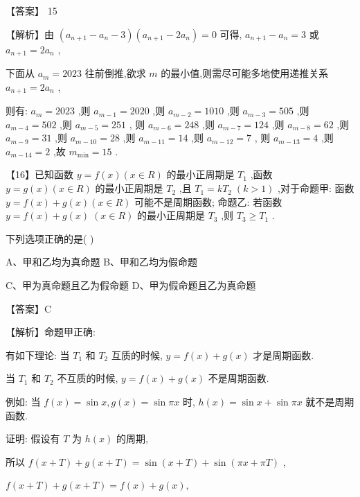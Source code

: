 \documentclass[10pt]{article}
\begin{document}
【答案】 15

【解析】由 \(\left( {{a}_{n + 1} - {a}_{n} - 3}\right) \left( {{a}_{n + 1} - 2{a}_{n}}\right)  = 0\) 可得, \({a}_{n + 1} - {a}_{n} = 3\) 或 \({a}_{n + 1} = 2{a}_{n}\) ,

下面从 \({a}_{m} = {2023}\) 往前倒推,欲求 \(m\) 的最小值,则需尽可能多地使用递推关系 \({a}_{n + 1} = 2{a}_{n}\) ,

则有: \({a}_{m} = {2023}\) ,则 \({a}_{m - 1} = {2020}\) ,则 \({a}_{m - 2} = {1010}\) ,则 \({a}_{m - 3} = {505}\) ,则 \({a}_{m - 4} = {502}\) ,则 \({a}_{m - 5} = {251}\) , 则 \({a}_{m - 6} = {248}\) ,则 \({a}_{m - 7} = {124}\) ,则 \({a}_{m - 8} = {62}\) ,则 \({a}_{m - 9} = {31}\) ,则 \({a}_{m - {10}} = {28}\) ,则 \({a}_{m - {11}} = {14}\) ,则 \({a}_{m - {12}} = 7\) , 则 \({a}_{m - {13}} = 4\) ,则 \({a}_{m - {14}} = 2\) ,故 \({m}_{\min } = {15}\) .

【16】已知函数 \(y = f\left( x\right) \left( {x \in  R}\right)\) 的最小正周期是 \({T}_{1}\) ,函数 \(y = g\left( x\right) \left( {x \in  R}\right)\) 的最小正周期是 \({T}_{2}\) ,且 \({T}_{1} = k{T}_{2} \; \left( {k > 1}\right)\) ,对于命题甲: 函数 \(y = f\left( x\right)  + g\left( x\right) \left( {x \in  R}\right)\) 可能不是周期函数; 命题乙: 若函数 \(y = f\left( x\right)  + g\left( x\right) \; \left( {x \in  R}\right)\) 的最小正周期是 \({T}_{3}\) ,则 \({T}_{3} \geq  {T}_{1}\) .

下列选项正确的是( )

A、甲和乙均为真命题 B、甲和乙均为假命题

C、甲为真命题且乙为假命题 D、甲为假命题且乙为真命题

【答案】C

【解析】命题甲正确:

有如下理论: 当 \({T}_{1}\) 和 \({T}_{2}\) 互质的时候, \(y = f\left( x\right)  + g\left( x\right)\) 才是周期函数.

当 \({T}_{1}\) 和 \({T}_{2}\) 不互质的时候, \(y = f\left( x\right)  + g\left( x\right)\) 不是周期函数.

例如: 当 \(f\left( x\right)  = \sin x,g\left( x\right)  = \sin {\pi x}\) 时, \(h\left( x\right)  = \sin x + \sin {\pi x}\) 就不是周期函数.

证明: 假设有 \(T\) 为 \(h\left( x\right)\) 的周期,

所以 \(f\left( {x + T}\right)  + g\left( {x + T}\right)  = \sin \left( {x + T}\right)  + \sin \left( {{\pi x} + {\pi T}}\right)\) ,

\(f\left( {x + T}\right)  + g\left( {x + T}\right)  = f\left( x\right)  + g\left( x\right) ,\)
\end{document}
